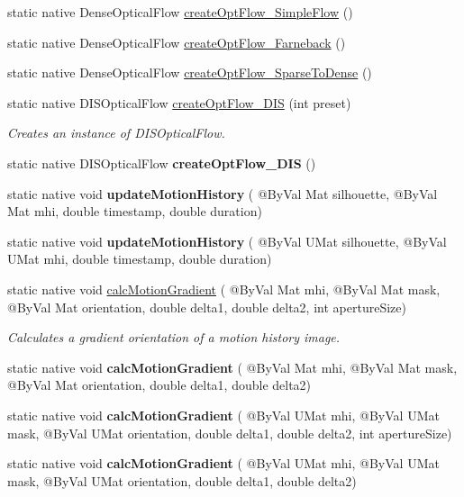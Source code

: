 \begin{DoxyCompactItemize}
static native Dense\+Optical\+Flow \hyperlink{group__optflow_gace52b781a9780c4c9a20951a2bec314d}{create\+Opt\+Flow\+\_\+\+Simple\+Flow} ()
\item 
static native Dense\+Optical\+Flow \hyperlink{group__optflow_gabd230cc626a64515ec35ac6c6c7fc099}{create\+Opt\+Flow\+\_\+\+Farneback} ()
\item 
static native Dense\+Optical\+Flow \hyperlink{group__optflow_ga2033e98010d9ac8b150503a107601946}{create\+Opt\+Flow\+\_\+\+Sparse\+To\+Dense} ()
\item 
static native D\+I\+S\+Optical\+Flow \hyperlink{group__optflow_gac107283f5dba4f320df3d9894aad537b}{create\+Opt\+Flow\+\_\+\+D\+IS} (int preset)
\begin{DoxyCompactList}\small\item\em Creates an instance of D\+I\+S\+Optical\+Flow. \end{DoxyCompactList}\item 
static native D\+I\+S\+Optical\+Flow {\bfseries create\+Opt\+Flow\+\_\+\+D\+IS} ()
\item 
static native void {\bfseries update\+Motion\+History} ( @By\+Val Mat silhouette, @By\+Val Mat mhi, double timestamp, double duration)
\item 
static native void {\bfseries update\+Motion\+History} ( @By\+Val U\+Mat silhouette, @By\+Val U\+Mat mhi, double timestamp, double duration)
\item 
static native void \hyperlink{group__optflow_ga1df8e7b81e72fc2df163a156ec07b5ed}{calc\+Motion\+Gradient} ( @By\+Val Mat mhi, @By\+Val Mat mask, @By\+Val Mat orientation, double delta1, double delta2, int aperture\+Size)
\begin{DoxyCompactList}\small\item\em Calculates a gradient orientation of a motion history image. \end{DoxyCompactList}\item 
static native void {\bfseries calc\+Motion\+Gradient} ( @By\+Val Mat mhi, @By\+Val Mat mask, @By\+Val Mat orientation, double delta1, double delta2)
\item 
static native void {\bfseries calc\+Motion\+Gradient} ( @By\+Val U\+Mat mhi, @By\+Val U\+Mat mask, @By\+Val U\+Mat orientation, double delta1, double delta2, int aperture\+Size)
\item 
static native void {\bfseries calc\+Motion\+Gradient} ( @By\+Val U\+Mat mhi, @By\+Val U\+Mat mask, @By\+Val U\+Mat orientation, double delta1, double delta2)
\item 

\end{DoxyCompactItemize}
